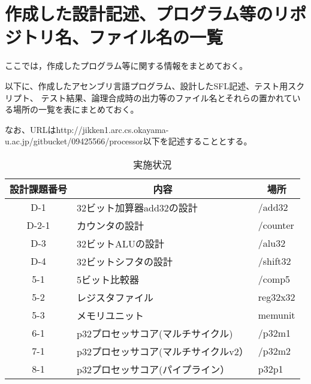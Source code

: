 \documentclass{jarticle}[11pt]
\begin{document}

\section{作成した設計記述、プログラム等のリポジトリ名、ファイル名の一覧}
\label{sec:作成した設計記述、プログラム等のリポジトリ名、ファイル名の一覧}

ここでは，作成したプログラム等に関する情報をまとめておく。


以下に、作成したアセンブリ言語プログラム、設計したSFL記述、テスト用スクリプト、
テスト結果、論理合成時の出力等のファイル名とそれらの置かれている場所の一覧を表にまとめておく。

なお、URLはhttp://jikken1.arc.cs.okayama-u.ac.jp/gitbucket/09425566/processor以下を記述することとする。

\begin{table*}[htb] %
\caption{実施状況}
\label{実施状況}
\begin{center}
\begin{tabular}{c|p{6cm}|p{4cm}}
\hline \hline
設計課題番号 & 
\multicolumn{1}{c}{内容} &
\multicolumn{1}{|c}{場所} 
\\ \hline

D-1 &
32ビット加算器add32の設計 &
/add32
\\

D-2-1 &
カウンタの設計 &
/counter
\\

D-3 &
32ビットALUの設計 &
/alu32
\\

D-4 &
32ビットシフタの設計 &
/shift32
\\

5-1 &
5ビット比較器 &
/comp5
\\

5-2 &
レジスタファイル &
reg32x32
\\

5-3 &
メモリユニット &
memunit
\\

6-1 &
p32プロセッサコア(マルチサイクル) &
/p32m1
\\

7-1 &
p32プロセッサコア(マルチサイクルv2） &
/p32m2
\\

8-1 &
p32プロセッサコア(パイプライン） &
p32p1
\\

\hline
\end{tabular}
\end{center}
\end{table*}
\end{document}
